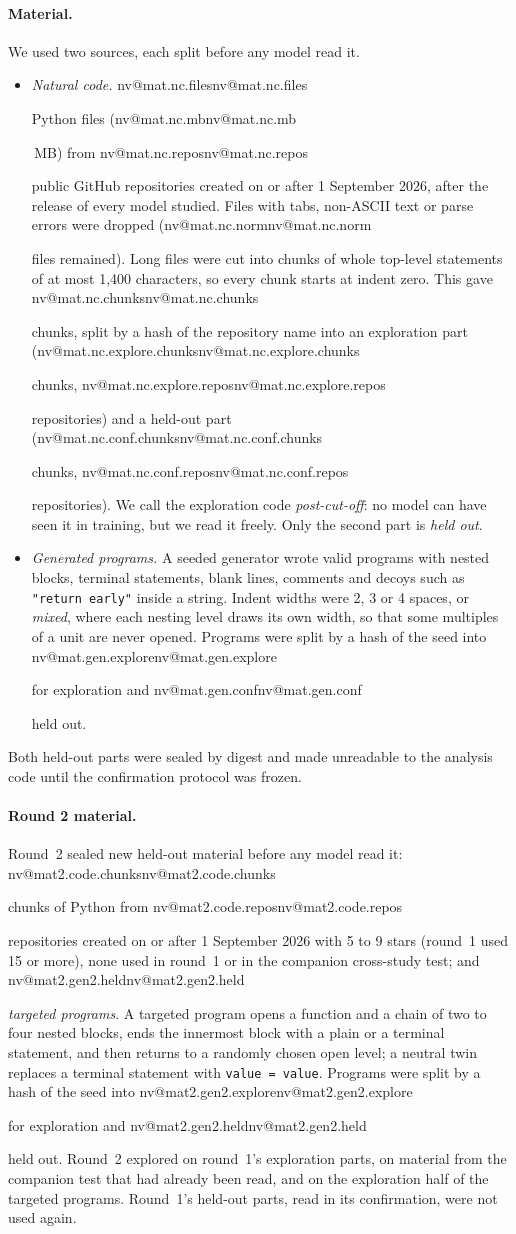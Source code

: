 \documentclass[11pt]{article}
\makeatletter
\newcommand{\nv}[1]{\ifcsname nv@#1\endcsname\csname nv@#1\endcsname\else\PackageError{numbers}{Unknown number key #1}{}\fi}
\newcommand{\code}[1]{\texttt{#1}}
\makeatother
\begin{document}
\paragraph{Material.} We used two sources, each split before any model read it.
\begin{itemize}
\item \emph{Natural code.} \nv{mat.nc.files} Python files (\nv{mat.nc.mb}\,MB) from \nv{mat.nc.repos} public GitHub repositories created on or after 1 September 2026, after the release of every model studied. Files with tabs, non-ASCII text or parse errors were dropped (\nv{mat.nc.norm} files remained). Long files were cut into chunks of whole top-level statements of at most 1{,}400 characters, so every chunk starts at indent zero. This gave \nv{mat.nc.chunks} chunks, split by a hash of the repository name into an exploration part (\nv{mat.nc.explore.chunks} chunks, \nv{mat.nc.explore.repos} repositories) and a held-out part (\nv{mat.nc.conf.chunks} chunks, \nv{mat.nc.conf.repos} repositories). We call the exploration code \emph{post-cut-off}: no model can have seen it in training, but we read it freely. Only the second part is \emph{held out}.
\item \emph{Generated programs.} A seeded generator wrote valid programs with nested blocks, terminal statements, blank lines, comments and decoys such as \code{"return early"} inside a string. Indent widths were 2, 3 or 4 spaces, or \emph{mixed}, where each nesting level draws its own width, so that some multiples of a unit are never opened. Programs were split by a hash of the seed into \nv{mat.gen.explore} for exploration and \nv{mat.gen.conf} held out.
\end{itemize}
Both held-out parts were sealed by digest and made unreadable to the analysis code until the confirmation protocol was frozen.

\paragraph{Round 2 material.} Round~2 sealed new held-out material before any model read it: \nv{mat2.code.chunks} chunks of Python from \nv{mat2.code.repos} repositories created on or after 1 September 2026 with 5 to 9 stars (round~1 used 15 or more), none used in round~1 or in the companion cross-study test; and \nv{mat2.gen2.held} \emph{targeted programs}. A targeted program opens a function and a chain of two to four nested blocks, ends the innermost block with a plain or a terminal statement, and then returns to a randomly chosen open level; a neutral twin replaces a terminal statement with \code{value = value}. Programs were split by a hash of the seed into \nv{mat2.gen2.explore} for exploration and \nv{mat2.gen2.held} held out. Round~2 explored on round~1's exploration parts, on material from the companion test that had already been read, and on the exploration half of the targeted programs. Round~1's held-out parts, read in its confirmation, were not used again.
\end{document}
